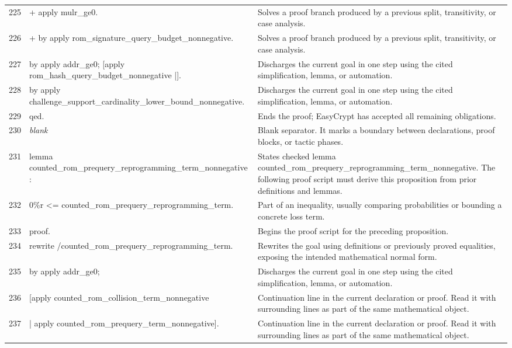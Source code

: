 \documentclass[10pt]{article}
\begin{document}
\begin{longtable}{r L{0.53\textwidth} L{0.37\textwidth}}
225 & {\ttfamily\scriptsize + apply mulr\_ge0.} & Solves a proof branch produced by a previous split, transitivity, or case analysis. \\
226 & {\ttfamily\scriptsize   + by apply rom\_signature\_query\_budget\_nonnegative.} & Solves a proof branch produced by a previous split, transitivity, or case analysis. \\
227 & {\ttfamily\scriptsize   by apply addr\_ge0; [apply rom\_hash\_query\_budget\_nonnegative |].} & Discharges the current goal in one step using the cited simplification, lemma, or automation. \\
228 & {\ttfamily\scriptsize by apply challenge\_support\_cardinality\_lower\_bound\_nonnegative.} & Discharges the current goal in one step using the cited simplification, lemma, or automation. \\
229 & {\ttfamily\scriptsize qed.} & Ends the proof; EasyCrypt has accepted all remaining obligations. \\
230 & {\ttfamily\scriptsize \emph{blank}} & Blank separator.  It marks a boundary between declarations, proof blocks, or tactic phases. \\
231 & {\ttfamily\scriptsize lemma counted\_rom\_prequery\_reprogramming\_term\_nonnegative :} & States checked lemma counted\_rom\_prequery\_reprogramming\_term\_nonnegative.  The following proof script must derive this proposition from prior definitions and lemmas. \\
232 & {\ttfamily\scriptsize   0\%r <= counted\_rom\_prequery\_reprogramming\_term.} & Part of an inequality, usually comparing probabilities or bounding a concrete loss term. \\
233 & {\ttfamily\scriptsize proof.} & Begins the proof script for the preceding proposition. \\
234 & {\ttfamily\scriptsize rewrite /counted\_rom\_prequery\_reprogramming\_term.} & Rewrites the goal using definitions or previously proved equalities, exposing the intended mathematical normal form. \\
235 & {\ttfamily\scriptsize by apply addr\_ge0;} & Discharges the current goal in one step using the cited simplification, lemma, or automation. \\
236 & {\ttfamily\scriptsize    [apply counted\_rom\_collision\_term\_nonnegative} & Continuation line in the current declaration or proof.  Read it with surrounding lines as part of the same mathematical object. \\
237 & {\ttfamily\scriptsize    | apply counted\_rom\_prequery\_term\_nonnegative].} & Continuation line in the current declaration or proof.  Read it with surrounding lines as part of the same mathematical object. \\

\end{longtable}
\end{document}
